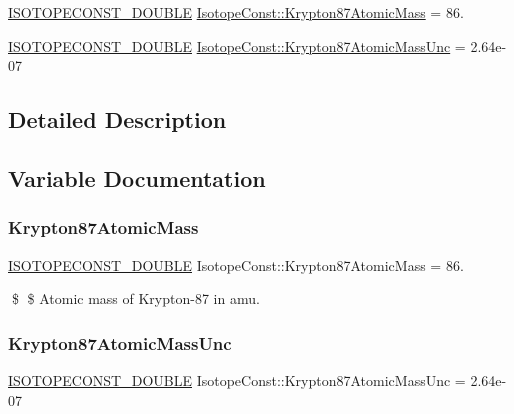 \begin{DoxyCompactItemize}
\item 
\mbox{\hyperlink{group___isotope_const-_macros_ga8f45a7272ce02c0b4c65c44636ed719a}{I\+S\+O\+T\+O\+P\+E\+C\+O\+N\+S\+T\+\_\+\+D\+O\+U\+B\+LE}} \mbox{\hyperlink{group___isotope_const-_krypton-_kr87_ga2f291cdb8dc0213ddc25cc1f7e7e7093}{Isotope\+Const\+::\+Krypton87\+Atomic\+Mass}} = 86.
\item 
\mbox{\hyperlink{group___isotope_const-_macros_ga8f45a7272ce02c0b4c65c44636ed719a}{I\+S\+O\+T\+O\+P\+E\+C\+O\+N\+S\+T\+\_\+\+D\+O\+U\+B\+LE}} \mbox{\hyperlink{group___isotope_const-_krypton-_kr87_gab1ea801f66a5a958ea20d03ceba017a0}{Isotope\+Const\+::\+Krypton87\+Atomic\+Mass\+Unc}} = 2.\+64e-\/07
\end{DoxyCompactItemize}


\subsection{Detailed Description}


\subsection{Variable Documentation}
\mbox{\label{group___isotope_const-_krypton-_kr87_ga2f291cdb8dc0213ddc25cc1f7e7e7093}} 
\subsubsection{\texorpdfstring{Krypton87\+Atomic\+Mass}{Krypton87AtomicMass}}
{\footnotesize\ttfamily \mbox{\hyperlink{group___isotope_const-_macros_ga8f45a7272ce02c0b4c65c44636ed719a}{I\+S\+O\+T\+O\+P\+E\+C\+O\+N\+S\+T\+\_\+\+D\+O\+U\+B\+LE}} Isotope\+Const\+::\+Krypton87\+Atomic\+Mass = 86.}

\$ \$ Atomic mass of Krypton-\/87 in amu. \mbox{\label{group___isotope_const-_krypton-_kr87_gab1ea801f66a5a958ea20d03ceba017a0}} 
\subsubsection{\texorpdfstring{Krypton87\+Atomic\+Mass\+Unc}{Krypton87AtomicMassUnc}}
{\footnotesize\ttfamily \mbox{\hyperlink{group___isotope_const-_macros_ga8f45a7272ce02c0b4c65c44636ed719a}{I\+S\+O\+T\+O\+P\+E\+C\+O\+N\+S\+T\+\_\+\+D\+O\+U\+B\+LE}} Isotope\+Const\+::\+Krypton87\+Atomic\+Mass\+Unc = 2.\+64e-\/07}


